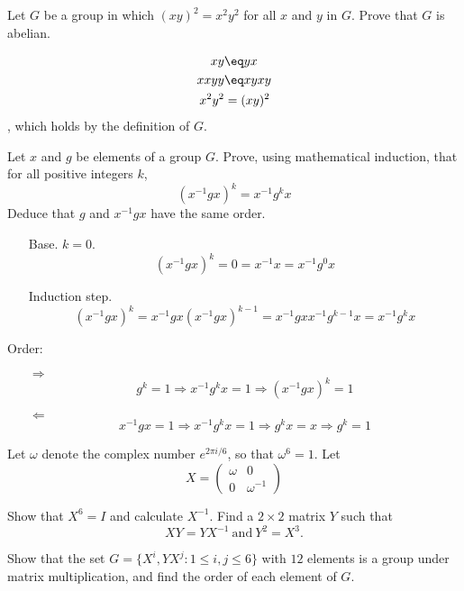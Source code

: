 \begin{exercise}
    Let \(G\) be a group in which \((xy)^2 = x^2y^2\) for all \(x\) and \(y\) in \(G\). Prove that \(G\) is abelian.
\end{exercise}

\begin{solution}
    \begin{align*}
        xy     & \eq yx   \\
        xxyy   & \eq xyxy \\
        x^2y^2 & = (xy)^2 \\
    \end{align*}
    , which holds by the definition of \(G\).
\end{solution}

\begin{exercise}
    Let \(x\) and \(g\) be elements of a group \(G\). Prove, using mathematical induction, that for all positive integers \(k\),
    \[(x^{ - 1}gx)^k = x^{ - 1}g^kx\]
    Deduce that \(g\) and \(x^{ - 1}gx\) have the same order.
\end{exercise}
\begin{solution}\itemfix
    \begin{itemize}
        \item [Base.] \(k = 0\).
              \[(x^{ - 1}gx)^k = 0 = x^{ - 1}x = x^{ - 1}g^0 x\]
        \item [Induction step.]
              \[(x^{ - 1}gx)^k = x^{ - 1}gx(x^{ - 1}gx)^{k - 1} = x^{ - 1}gx x^{ - 1}g^{k - 1}x = x^{ - 1}g^k x\]
    \end{itemize}

    Order:
    \begin{itemize}
        \item [\( \Rightarrow \)]
              \[g^k = 1 \Rightarrow x^{ - 1}g^k x = 1 \Rightarrow (x^{ - 1}gx)^k = 1\]
        \item [\( \Leftarrow \)]
              \[x^{ - 1}gx = 1 \Rightarrow x^{ - 1}g^kx = 1 \Rightarrow g^kx = x \Rightarrow g^k = 1\]
    \end{itemize}
\end{solution}

\begin{exercise}
    Let \(\omega\) denote the complex number \(e^{2\pi i / 6}\), so that \(\omega^6 = 1\). Let
    \[X = \begin{pmatrix} \omega & 0 \\ 0 & \omega^{ - 1} \end{pmatrix}\]

    Show that \(X^6 = I\) and calculate \(X^{ - 1}\). Find a \(2 \times 2\) matrix \(Y\) such that
    \[XY = YX^{ - 1}\ \mathrm{and}\ Y^2 = X^3.\]

    Show that the set \(G = \{X^i, YX^j : 1 \leq i,j \leq 6\}\) with \(12\) elements is a group under matrix multiplication, and find the order of each element of \(G\).
\end{exercise}

